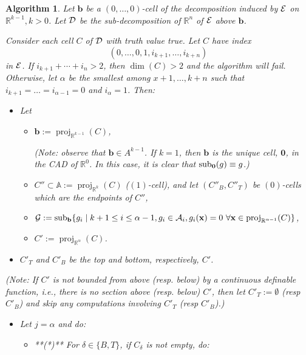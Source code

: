 \documentclass[
]{book}
\newtheorem{algorithm}{Algorithm}
\theoremstyle{definition}
\theoremstyle{definition}
\theoremstyle{definition}
\theoremstyle{definition}
\theoremstyle{remark}
\begin{document}
\begin{algorithm}
Let \(\mathbf{b}\) be a \((0,\ldots,0)\)-cell of the decomposition induced by \(\cal E\) on \(\mathbb{R}^{k-1}, k > 0\). Let \(\cal D\) be the sub-decomposition of \(\mathbb{R}^n\) of \(\cal E\) above \(\mathbf{b}\).

Consider each cell \(C\) of \(\cal D\) with truth value \emph{true}. Let \(C\) have index
\[
(0,\ldots,0,1,i_{k+1},\ldots,i_{k+n})
\]
in \(\cal E\). If \(i_{k+1} + \cdots + i_n > 2\), then \(\dim(C) > 2\) and the algorithm will fail. Otherwise, let \(\alpha\) be the smallest among \(x+1,\ldots,k+n\) such that \(i_{k+1} = \ldots = i_{\alpha - 1} = 0\) and \(i_\alpha = 1\).
Then:

\begin{itemize}
\item
  Let

  \begin{itemize}
  \item
    \(\mathbf{b} := {\operatorname{proj}_{\mathbb{R}^{k-1}}}(C)\),

    \emph{(Note: observe that \(\mathbf{b} \in A^{k-1}\). If \(k = 1\), then \(\mathbf{b}\) is the unique cell, \(\mathbf{0}\), in the CAD of \(\mathbb{R}^0\). In this case, it is clear that \({\rm sub}_\mathbf{0} (g) \equiv g\).)}
  \item
    \(C'' \subset \mathbb{A}:= {\operatorname{proj}_{\mathbb{R}^{k}}}(C)\) (\((1)\)-cell), and let \((C''_B, C''_T)\) be \((0)\)-cells which are the endpoints of \(C''\),
  \item
    \({\cal G} := {\rm sub}_{\mathbf{b}} \{ g_i \mid k+1 \le i \le \alpha - 1, g_i \in {\cal A}_i, g_i(\mathbf{x}) = 0 \ \forall \mathbf{x} \in {\operatorname{proj}_{\mathbb{R}^{\alpha-1}}}(C) \}\),
  \item
    \(C' := {\operatorname{proj}_{\mathbb{R}^{\alpha}}}(C)\).
  \end{itemize}
\item
  \(C'_T\) and \(C'_B\) be the top and bottom, respectively, \(C'\).
\end{itemize}

(\emph{Note: If \(C'\) is not bounded from above (resp. below) by a continuous definable function, i.e., there is no section above (resp. below) \(C'\), then let \(C'_T := \emptyset\) (resp \(C'_B\)) and skip any computations involving \(C'_T\) (resp \(C'_B\)).)}

\begin{itemize}
\item
  Let \(j = \alpha\) and do:

  \begin{itemize}
  \item
    **(*)** For \(\delta \in \{B, T\}\), if \(C_\delta\) is not empty, do:


\end{itemize}
\end{itemize}
\end{algorithm}
\end{document}
